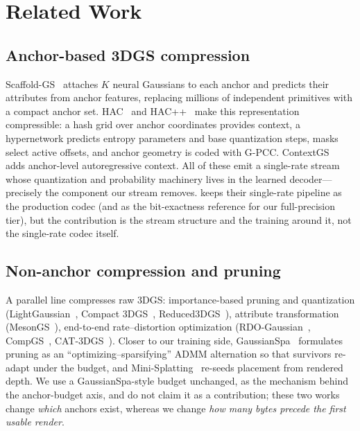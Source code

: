 \section{Related Work}
\label{sec:related}

\subsection{Anchor-based 3DGS compression}
Scaffold-GS~\cite{lu2024} attaches $K$ neural Gaussians to each anchor and predicts their attributes from anchor features, replacing millions of independent primitives with a compact anchor set.
HAC~\cite{chen2024} and HAC++~\cite{chen2025} make this representation compressible: a hash grid over anchor coordinates provides context, a hypernetwork predicts entropy parameters and base quantization steps, masks select active offsets, and anchor geometry is coded with G-PCC.
ContextGS~\cite{wang2024b} adds anchor-level autoregressive context.
All of these emit a single-rate stream whose quantization and probability machinery lives in the learned decoder---precisely the component our stream removes.
\DCCA keeps their single-rate pipeline as the production codec (and as the bit-exactness reference for our full-precision tier), but the contribution is the stream structure and the training around it, not the single-rate codec itself.

\subsection{Non-anchor compression and pruning}
A parallel line compresses raw 3DGS: importance-based pruning and quantization (LightGaussian~\cite{fan2024}, Compact 3DGS~\cite{lee2024}, Reduced3DGS~\cite{papantonakis2024}), attribute transformation (MesonGS~\cite{xie2024}), end-to-end rate--distortion optimization (RDO-Gaussian~\cite{wang2024a}, CompGS~\cite{liu2024b}, CAT-3DGS~\cite{zhan2025}).
Closer to our training side, GaussianSpa~\cite{zhang2025gaussianspa} formulates pruning as an ``optimizing--sparsifying'' ADMM alternation so that survivors re-adapt under the budget, and Mini-Splatting~\cite{fang2024} re-seeds placement from rendered depth.
We use a GaussianSpa-style budget unchanged, as the mechanism behind the anchor-budget axis, and do not claim it as a contribution; these two works change \emph{which} anchors exist, whereas we change \emph{how many bytes precede the first usable render}.

